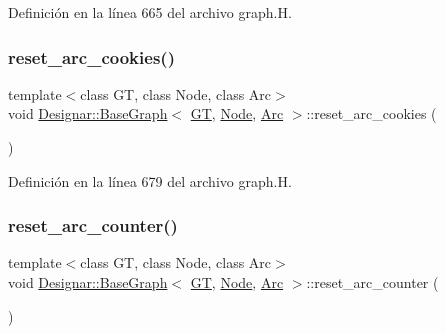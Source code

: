 Definición en la línea 665 del archivo graph.\+H.

\mbox{\label{class_designar_1_1_base_graph_a44b6cefb8966ed69a0d80bfe7e4546cb}} 
\subsubsection{\texorpdfstring{reset\+\_\+arc\+\_\+cookies()}{reset\_arc\_cookies()}}
{\footnotesize\ttfamily template$<$class GT, class Node, class Arc$>$ \\
void \hyperlink{class_designar_1_1_base_graph}{Designar\+::\+Base\+Graph}$<$ \hyperlink{demo-buildgraph_8_c_a3001c40d2c31ca87ed96cd7d1334a55e}{GT}, \hyperlink{namespace_designar_a5af326c65aa2bd26b26c410f2030d09e}{Node}, \hyperlink{namespace_designar_a3f55fb5513d62ff47cbc8f72b8e95d6f}{Arc} $>$\+::reset\+\_\+arc\+\_\+cookies (\begin{DoxyParamCaption}{ }\end{DoxyParamCaption})\hspace{0.3cm}{\ttfamily [inline]}}



Definición en la línea 679 del archivo graph.\+H.

\mbox{\label{class_designar_1_1_base_graph_a8b22e29aa37006fab9c219de86660bdd}} 
\subsubsection{\texorpdfstring{reset\+\_\+arc\+\_\+counter()}{reset\_arc\_counter()}}
{\footnotesize\ttfamily template$<$class GT, class Node, class Arc$>$ \\
void \hyperlink{class_designar_1_1_base_graph}{Designar\+::\+Base\+Graph}$<$ \hyperlink{demo-buildgraph_8_c_a3001c40d2c31ca87ed96cd7d1334a55e}{GT}, \hyperlink{namespace_designar_a5af326c65aa2bd26b26c410f2030d09e}{Node}, \hyperlink{namespace_designar_a3f55fb5513d62ff47cbc8f72b8e95d6f}{Arc} $>$\+::reset\+\_\+arc\+\_\+counter (\begin{DoxyParamCaption}{ }\end{DoxyParamCaption})\hspace{0.3cm}{\ttfamily [inline]}}



